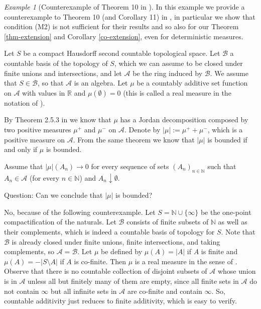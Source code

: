\documentclass{article}
\theoremstyle{plain}
\theoremstyle{remark}
\newtheorem*{example}{Example}
\begin{document}
\begin{example}[Counterexample of Theorem 10 in \cite{Jacob1995}] In this example we provide a counterexample to Theorem 10 (and Corollary 11) in \cite{Jacob1995}, in particular we show that condition (M2) is not sufficient for their results and so also for our Theorem \ref{thm-extension} and Corollary \ref{co-extension}, even for deterministic measures.
	
	Let $S$ be a compact Hausdorff second countable topological space. Let $\mathcal{B}$ a countable basis of the topology of $S$, which we can assume to be closed under finite unions and intersections, and let $\mathcal{A}$ be the ring induced by $\mathcal{B}$. We assume that $S\in\mathcal{B}$, so that $\mathcal{A}$ is an algebra. Let $\mu$ be a countably additive set function on $\mathcal{A}$ with values in $\mathbb{R}$ and $\mu(\emptyset)=0$ (this is called a real measure in the notation of \cite{RaoRao93}).
	
	By Theorem 2.5.3 in \cite{RaoRao93} we know that $\mu$ has a Jordan decomposition composed by two positive measures $\mu^+$ and $\mu^-$ on $\mathcal{A}$. Denote by $|\mu|:=\mu^++\mu^-$, which is a positive measure on $\mathcal{A}$. From the same theorem we know that $|\mu|$ is bounded if and only if $\mu$ is bounded.
	
	Assume that $|\mu|(A_n)\to0$ for every sequence of sets $(A_n)_{n\in\mathbb{N}}$ such that $A_n\in\mathcal{A}$ (for every $n\in\mathbb{N}$) and $A_n\downarrow\emptyset$.
	
	Question: Can we conclude that $|\mu|$ is bounded?
	
	No, because of the following counterexample. Let $S = \mathbb{N} \cup \{\infty\}$ be the one-point compactification of the naturals. Let $\mathcal{B}$ consists of finite subsets of $\mathbb{N}$ as well as their complements, which is indeed a countable basis of topology for $S$. Note that $\mathcal{B}$ is already closed under finite unions, finite intersections, and taking complements, so $\mathcal{A} = \mathcal{B}$. Let $\mu$ be defined by $\mu(A) = |A|$ if $A$ is finite and $\mu(A) = -|S \setminus A|$ if $A$ is co-finite. Then $\mu$ is a real measure in the sense of \cite{RaoRao93}. Observe that there is no countable collection of disjoint subsets of $\mathcal{A}$ whose union is in $\mathcal{A}$ unless all but finitely many of them are empty, since all finite sets in $\mathcal{A}$ do not contain $\infty$ but all infinite sets in $\mathcal{A}$ are co-finite and contain $\infty$. So, countable additivity just reduces to finite additivity, which is easy to verify.
	

\end{example}
\end{document}
